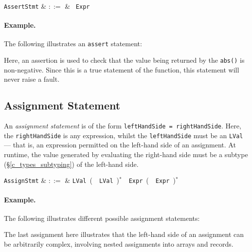 \begin{syntax}
  \verb+AssertStmt+ & $::=$ & \ \verb+Expr+\\
\end{syntax}

\paragraph{Example.} The following illustrates an \lstinline{assert} statement:



Here, an assertion is used to check that the value being returned by the \lstinline{abs()} is non-negative.  Since this is a true statement of the function, this statement will never raise a fault.


\subsection{Assignment Statement}

An {\em assignment statement} is of the form \lstinline{leftHandSide = rightHandSide}.  Here, the \lstinline{rightHandSide} is any expression, whilst the \lstinline{leftHandSide} must be an \lstinline{LVal} --- that is, an expression permitted on the left-hand side of an assignment.  At runtime, the value generated by evaluating the right-hand side must be a subtype (\S\ref{c_types_subtyping}) of the left-hand side.

\begin{syntax}
  \verb+AssignStmt+ & $::=$ & \verb+LVal+\ \big(\ \token{,}\ \verb+LVal+\ \big)$^*$\ \token{=}\ \verb+Expr+\ \big(\ \token{,}\ \verb+Expr+\ \big)$^*$\\
\end{syntax}


\paragraph{Example.} The following illustrates different possible assignment statements:



The last assignment here illustrates that the left-hand side of an assignment can be arbitrarily complex, involving nested assignments into arrays and records.

